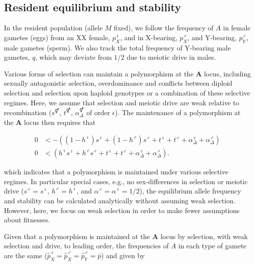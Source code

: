 \documentclass[12pt]{article}
\begin{document}
\subsection*{Resident equilibrium and stability}
In the resident population (allele $M$ fixed), we follow the frequency of $A$ in female gametes (eggs) from an XX female, $p^\female_X$, and in X-bearing, $p^\male_X$, and Y-bearing, $p^\male_Y$, male gametes (sperm).
We also track the total frequency of Y-bearing male gametes, $q$, which may deviate from $1/2$ due to meiotic drive in males. 

Various forms of selection can maintain a polymorphism at the \textbf{A} locus, including sexually antagonistic selection, overdominance and conflicts between diploid selection and selection upon haploid genotypes \citep[ploidally antagonistic selection,][]{Immler:2012tl} or a combination of these selective regimes. 
Here, we assume that selection and meiotic drive are weak relative to recombination ($s^\Hermaphrodite$, $t^\Hermaphrodite$, $\alpha_{\Delta}^\Hermaphrodite$ of order $\epsilon$). 
The maintenance of a polymorphism at the \textbf{A} locus then requires that

\begin{equation}
\begin{split}
0&<-((1-h^\female)s^\female +(1-h^\male) s^\male + t^\female +t^\male + \alpha_{\Delta}^\female+\alpha_{\Delta}^\male)\\
%
0&<(h^\female s^\female +h^\male s^\male + t^\female +t^\male + \alpha_{\Delta}^\female+\alpha_{\Delta}^\male).
\end{split}
\end{equation}

\noindent
which indicates that a polymorphism is maintained under various selective regimes. 
In particular special cases, e.g., no sex-differences in selection or meiotic drive ($s^\male=s^\female$, $h^\male=h^\female$, and $\alpha^\male=\alpha^\female=1/2$), the equilibrium allele frequency and stability can be calculated analytically without assuming weak selection. 
However, here, we focus on weak selection in order to make fewer assumptions about fitnesses. 

Given that a polymorphism is maintained at the \textbf{A} locus by selection, with weak selection and drive, to leading order, the frequencies of $A$ in each type of gamete are the same ($\hat{p}^\female_X=\hat{p}^\male_X=\hat{p}^\male_Y=\bar{p}$) and given by 
\end{document}
